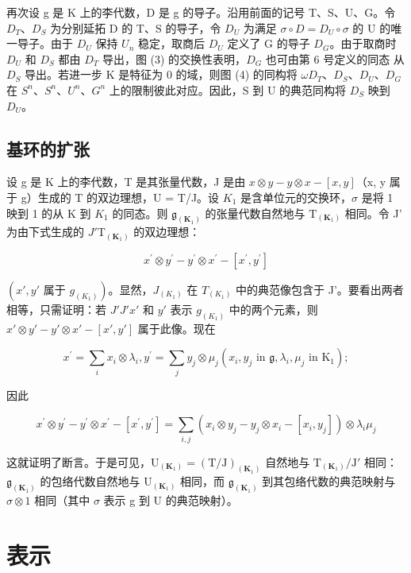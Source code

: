 再次设 g 是 K 上的李代数，D 是 g 的导子。沿用前面的记号 T、S、U、G。令 \(D_{T}\)、\(D_{S}\) 为分别延拓 D 的 T、S 的导子，令 \(D_{U}\) 为满足 \(\sigma \circ D = D_{U} \circ \sigma\) 的 U 的唯一导子。由于 \(D_{U}\) 保持 \(U_{n}\) 稳定，取商后 \(D_{U}\) 定义了 G 的导子 \(D_{G}\)。由于取商时 \(D_{U}\) 和 \(D_{S}\) 都由 \(D_{T}\) 导出，图 (3) 的交换性表明，\(D_{G}\) 也可由第 6 号定义的同态  从 \(D_{S}\) 导出。若进一步 K 是特征为 0 的域，则图 (4) 的同构将 \(\omega\)\(D_{T}\)、\(D_{S}\)、\(D_{U}\)、\(D_{G}\) 在 \(S^{n}\)、\(S^{n}\)、\(U^{n}\)、\(G^{n}\) 上的限制彼此对应。因此，S 到 U 的典范同构将 \(D_{S}\) 映到 \(D_{U}\)。

\subsection{基环的扩张}

设 g 是 K 上的李代数，T 是其张量代数，J 是由 \(x \otimes y - y \otimes x - [x, y]\)（x, y 属于 g）生成的 T 的双边理想，U = T/J。设 \(K_{1}\) 是含单位元的交换环，\(\sigma\) 是将 1 映到 1 的从 K 到 \(K_{1}\) 的同态。则 \(\mathfrak{g}_{(\mathbf{K}_{1})}\) 的张量代数自然地与 \(\mathrm{T}_{(\mathbf{K}_{1})}\) 相同。令 J' 为由下式生成的 \(J'\)\(\mathrm{T}_{(\mathbf{K}_{1})}\) 的双边理想：

\[
x ^ {\prime} \otimes y ^ {\prime} - y ^ {\prime} \otimes x ^ {\prime} - [ x ^ {\prime}, y ^ {\prime} ]
\]

\((x', y' \text{ 属于 } g_{(K_1)})\)。显然，\(J_{(K_1)}\) 在 \(T_{(K_1)}\) 中的典范像包含于 J'。要看出两者相等，只需证明：若 \(J'\)\(J'\)\(x'\) 和 \(y'\) 表示 \(g_{(K_1)}\) 中的两个元素，则 \(x' \otimes y' - y' \otimes x' - [x', y']\) 属于此像。现在

\[
x ^ {\prime} = \sum_ {i} x _ {i} \otimes \lambda_ {i}, y ^ {\prime} = \sum_ {j} y _ {j} \otimes \mu_ {j} (x _ {i}, y _ {j} \text {   in   } \mathfrak {g}, \lambda_ {i}, \mu_ {j} \text {   in   } \mathrm{K} _ {1});
\]

因此

\[
x ^ {\prime} \otimes y ^ {\prime} - y ^ {\prime} \otimes x ^ {\prime} - [ x ^ {\prime}, y ^ {\prime} ] = \sum_ {i, j} (x _ {i} \otimes y _ {j} - y _ {j} \otimes x _ {i} - [ x _ {i}, y _ {j} ]) \otimes \lambda_ {i} \mu_ {j}
\]

这就证明了断言。于是可见，\(\mathrm{U}_{(\mathbf{K}_{1})} = (\mathrm{T}/\mathrm{J})_{(\mathbf{K}_{1})}\) 自然地与 \(\mathrm{T}_{(\mathbf{K}_{1})}/\mathrm{J}'\) 相同：\(\mathfrak{g}_{(\mathbf{K}_{1})}\) 的包络代数自然地与 \(\mathrm{U}_{(\mathbf{K}_{1})}\) 相同，而 \(\mathfrak{g}_{(\mathbf{K}_{1})}\) 到其包络代数的典范映射与 \(\sigma \otimes 1\) 相同（其中 \(\sigma\) 表示 g 到 U 的典范映射）。

\section{表示}

